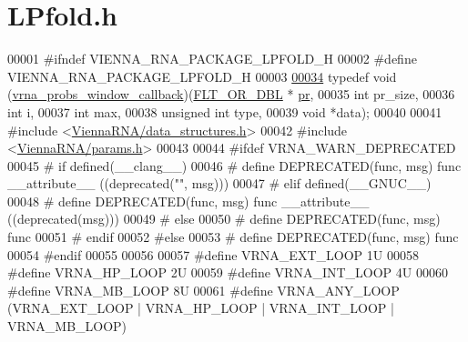 \hypertarget{LPfold_8h_source}{}\section{L\+Pfold.\+h}
\label{LPfold_8h_source}

\begin{DoxyCode}
00001 \textcolor{preprocessor}{#ifndef VIENNA\_RNA\_PACKAGE\_LPFOLD\_H}
00002 \textcolor{preprocessor}{#define VIENNA\_RNA\_PACKAGE\_LPFOLD\_H}
00003 
\hyperlink{LPfold_8h_abe710a1182e6db69cc75329dfc9bed67}{00034} \textcolor{keyword}{typedef} void (\hyperlink{LPfold_8h_abe710a1182e6db69cc75329dfc9bed67}{vrna\_probs\_window\_callback})(\hyperlink{group__data__structures_ga31125aeace516926bf7f251f759b6126}{FLT\_OR\_DBL}    *
      \hyperlink{fold__vars_8h_ac98ec419070aee6831b44e5c700f090f}{pr},
00035                                           \textcolor{keywordtype}{int}           pr\_size,
00036                                           \textcolor{keywordtype}{int}           i,
00037                                           \textcolor{keywordtype}{int}           max,
00038                                           \textcolor{keywordtype}{unsigned} \textcolor{keywordtype}{int}  type,
00039                                           \textcolor{keywordtype}{void}          *data);
00040 
00041 \textcolor{preprocessor}{#include <\hyperlink{data__structures_8h}{ViennaRNA/data\_structures.h}>}
00042 \textcolor{preprocessor}{#include <\hyperlink{params_8h}{ViennaRNA/params.h}>}
00043 
00044 \textcolor{preprocessor}{#ifdef VRNA\_WARN\_DEPRECATED}
00045 \textcolor{preprocessor}{# if defined(\_\_clang\_\_)}
00046 \textcolor{preprocessor}{#  define DEPRECATED(func, msg) func \_\_attribute\_\_ ((deprecated("", msg)))}
00047 \textcolor{preprocessor}{# elif defined(\_\_GNUC\_\_)}
00048 \textcolor{preprocessor}{#  define DEPRECATED(func, msg) func \_\_attribute\_\_ ((deprecated(msg)))}
00049 \textcolor{preprocessor}{# else}
00050 \textcolor{preprocessor}{#  define DEPRECATED(func, msg) func}
00051 \textcolor{preprocessor}{# endif}
00052 \textcolor{preprocessor}{#else}
00053 \textcolor{preprocessor}{# define DEPRECATED(func, msg) func}
00054 \textcolor{preprocessor}{#endif}
00055 
00056 
00057 \textcolor{preprocessor}{#define VRNA\_EXT\_LOOP   1U}
00058 \textcolor{preprocessor}{#define VRNA\_HP\_LOOP    2U}
00059 \textcolor{preprocessor}{#define VRNA\_INT\_LOOP   4U}
00060 \textcolor{preprocessor}{#define VRNA\_MB\_LOOP    8U}
00061 \textcolor{preprocessor}{#define VRNA\_ANY\_LOOP   (VRNA\_EXT\_LOOP | VRNA\_HP\_LOOP | VRNA\_INT\_LOOP | VRNA\_MB\_LOOP)}

\end{DoxyCode}
